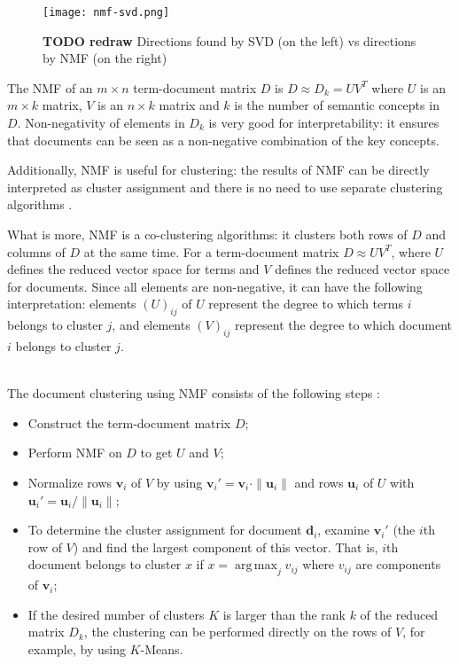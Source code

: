 \begin{figure}[h]
\centering\texttt{[image: nmf-svd.png]}
\caption{\textbf{TODO redraw} Directions found by  SVD (on the left) vs directions by NMF (on the right)}
\label{fig:nmf-svd}
\end{figure}


The NMF of an $m \times n$ term-document matrix $D$ is $D \approx D_k = U  V^T$
where $U$ is an $m \times k$ matrix, $V$ is an $n \times k$ matrix and
$k$ is the number of semantic concepts in $D$.
Non-negativity of elements in $D_k$ is very good for interpretability: it
ensures that documents can be seen as a non-negative combination of
the key concepts.


Additionally, NMF is useful for clustering: the results of NMF can
be directly interpreted as cluster assignment and there is no need
to use separate clustering algorithms \cite{xu2003document}.

What is more, NMF is a co-clustering algorithms: it clusters both
rows of $D$ and columns of $D$ at the same time. For a term-document
matrix $D \approx U V^T$, where $U$ defines the reduced vector space for terms
and $V$ defines the reduced vector space for documents. Since all elements
are non-negative, it can have the following interpretation:
elements $(U)_{ij}$ of $U$ represent the degree to which terms $i$ belongs to cluster $j$,
and elements $(V)_{ij}$ represent the degree to which document $i$ belongs to cluster $j$.

\ \\

The document clustering using NMF consists of the following
steps \cite{xu2003document}:

\begin{itemize}
  \item Construct the term-document matrix $D$;
  \item Perform NMF on $D$ to get $U$ and $V$;
  \item Normalize rows $\mathbf v_i$ of $V$ by using $\mathbf v_i' = \mathbf v_i \cdot \| \mathbf u_i \|$ and rows $\mathbf u_i$ of $U$ with $\mathbf u_i' = \mathbf u_i / \| \mathbf u_i \|$;
  \item To determine the cluster assignment for document $\mathbf d_i$, examine $\mathbf v_i'$ (the $i$th row of $V$) and find the largest component of this vector. That is,
      $i$th document belongs to cluster $x$ if $x = \operatorname{arg \, max}_j v_{ij}$ where $v_{ij}$ are components of $\mathbf v_i$;
  \item If the desired number of clusters $K$ is larger than the rank $k$ of the reduced matrix $D_k$, the clustering can be performed directly on the rows of $V$, for example,
      by using $K$-Means.
\end{itemize}

